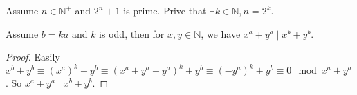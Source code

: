 \documentclass{ctexart}
\newif\ifpreface
\begin{document}
\large
\iffalse
	\setlength{\baselineskip}{1.2em}
	\ifpreface
		
	\else
		\maketitle
	\fi
\fi
{}

\begin{problem}\label{pro:p14.5}
Assume \(n \in \mathbb{N}^+\) and \(2^n + 1\) is prime. Prive that \(\exists k \in \mathbb{N},n=2^k\).
\end{problem}
\begin{lemma}\label{lem:1}
	Assume \(b=ka\) and \(k\) is odd, then for \(x,y \in \mathbb{N}\), we have \(x^a + y^a \mid x^b + y^b\).
\end{lemma}
\begin{proof}
	Easily \(x^b + y^b \equiv (x^a)^k + y^b \equiv (x^a + y^a - y^a)^k + y^b \equiv (-y^a)^k + y^b \equiv 0 \mod x^a + y^a\).
	So \(x^a + y^a \mid x^b + y^b\).
\end{proof}
\end{document}
